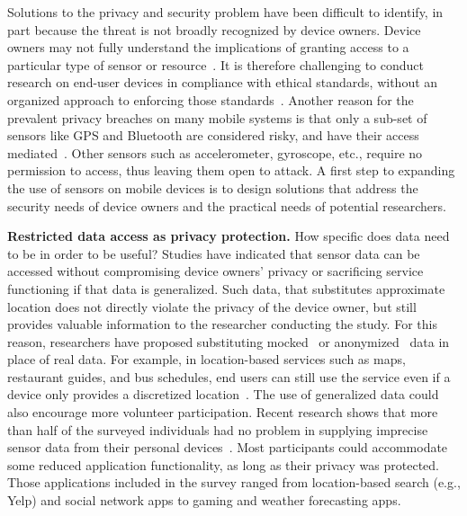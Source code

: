 Solutions to the privacy and security problem have been difficult to 
identify, in part because the threat is not broadly recognized by device 
owners. Device owners may not fully 
understand the implications of granting access to a particular type of 
sensor or resource~\cite{felt2012android}. It is therefore challenging to 
conduct research on end-user devices in compliance with ethical standards, 
without an organized approach to enforcing those 
standards~\cite{zevenbergen2013ethical}. Another reason for 
the prevalent privacy breaches on many mobile systems %
is that only a sub-set of sensors like GPS and Bluetooth are considered risky, 	
and have their access mediated~\cite{android-sec}. Other sensors 
such as accelerometer, gyroscope, etc., require no permission to access, 
thus leaving them open to attack. A first step to expanding the use of sensors on mobile devices is to design solutions that address the security needs of device owners and the practical needs of potential researchers.

\textbf{Restricted data access as privacy protection.}
How specific does data need to be in order to be useful? Studies have indicated that 
sensor data can be accessed without compromising device 
owners' privacy or sacrificing service functioning if that data is generalized. 
Such data, that substitutes approximate location does not 
directly violate the privacy of the device owner, but still provides 
valuable information to the researcher conducting the study.
For this reason, researchers have proposed 
substituting mocked~\cite{beresford2011mockdroid} or 
anonymized~\cite{zhou2011taming} data in place of real data. 
For example, in location-based services such as maps, 
restaurant guides, and bus schedules, end users can still use the 
service even if a device only provides a discretized 
location~\cite{amini2011cache, krumm2007inference}. The use of 
generalized data could also encourage more volunteer participation. 
Recent research shows that more than half of the 
surveyed individuals had no problem in supplying imprecise 
sensor data from their personal devices~\cite{fawaz2014location}. 
Most participants could accommodate some reduced application 
functionality, as long as their privacy was protected. Those 
applications included in the survey
ranged from location-based search (e.g., Yelp) and social 
network apps to gaming and weather forecasting apps. 

